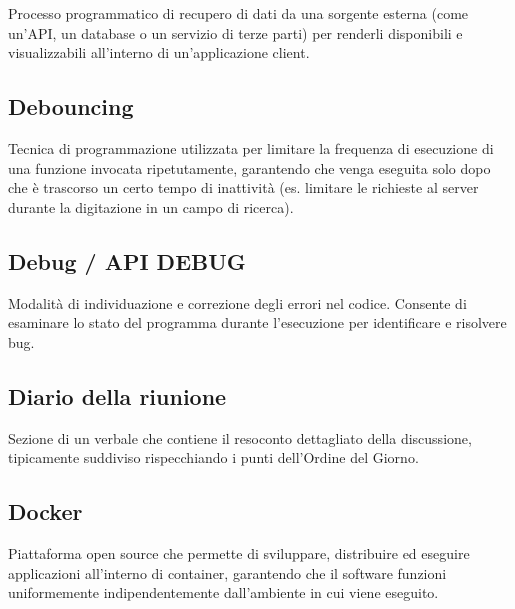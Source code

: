 \documentclass[a4paper, 11pt, oneside]{scrartcl} %
\begin{document}
Processo programmatico di recupero di dati da una sorgente esterna (come un'API, un database o un servizio di terze parti) per renderli disponibili e visualizzabili all'interno di un'applicazione client.

\vspace{0.5cm}

\subsection*{Debouncing}


Tecnica di programmazione utilizzata per limitare la frequenza di esecuzione di una funzione invocata ripetutamente, garantendo che venga eseguita solo dopo che è trascorso un certo tempo di inattività (es. limitare le richieste al server durante la digitazione in un campo di ricerca).

\vspace{0.5cm}

\subsection*{Debug / API DEBUG}


Modalità di individuazione e correzione degli errori nel codice. Consente di esaminare lo stato del programma durante l'esecuzione per identificare e risolvere bug.

\vspace{0.5cm}

\subsection*{Diario della riunione}


Sezione di un verbale che contiene il resoconto dettagliato della discussione, tipicamente suddiviso rispecchiando i punti dell'Ordine del Giorno.

\vspace{0.5cm}

\subsection*{Docker}
Piattaforma open source che permette di sviluppare, distribuire ed eseguire applicazioni all'interno di container, garantendo che il software funzioni uniformemente indipendentemente dall'ambiente in cui viene eseguito.
\vspace{0.5cm}
\end{document}

